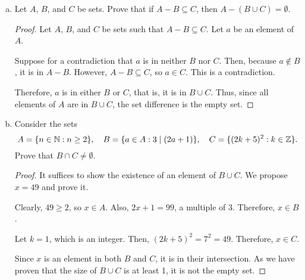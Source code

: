 \question \begin{enumerate}[(a)]
  \item Let $A$, $B$, and $C$ be sets.
        Prove that if $A-B \subseteq C$, then $A - (B \cup C) = \emptyset$.
        \begin{proof}
          Let $A$, $B$, and $C$ be sets such that $A-B \subseteq C$.
          Let $a$ be an element of $A$.

          Suppose for a contradiction that $a$ is in neither $B$ nor $C$.
          Then, because $a\not\in B$, it is in $A-B$.
          However, $A-B \subseteq C$, so $a \in C$.
          This is a contradiction.

          Therefore, $a$ is in either $B$ or $C$, that is, it is in $B \cup C$.
          Thus, since all elements of $A$ are in $B \cup C$, the set difference is the empty set.
        \end{proof}
  \item Consider the sets \begin{equation*}
          A = \{n\in\mathbb{N} : n \geq 2\}, \quad B=\{a\in A : 3 \mid (2a+1)\}, \quad C=\{(2k+5)^2 : k\in\mathbb{Z}\}.
        \end{equation*}
        Prove that $B \cap C \neq \emptyset$.
        \begin{proof}
          It suffices to show the existence of an element of $B \cup C$.
          We propose $x = 49$ and prove it.

          Clearly, $49 \geq 2$, so $x \in A$.
          Also, $2x+1 = 99$, a multiple of 3.
          Therefore, $x \in B$.

          Let $k = 1$, which is an integer.
          Then, $(2k+5)^2 = 7^2 = 49$.
          Therefore, $x \in C$.

          Since $x$ is an element in both $B$ and $C$, it is in their intersection.
          As we have proven that the size of $B \cup C$ is at least 1, it is not the empty set.
        \end{proof}
\end{enumerate}


